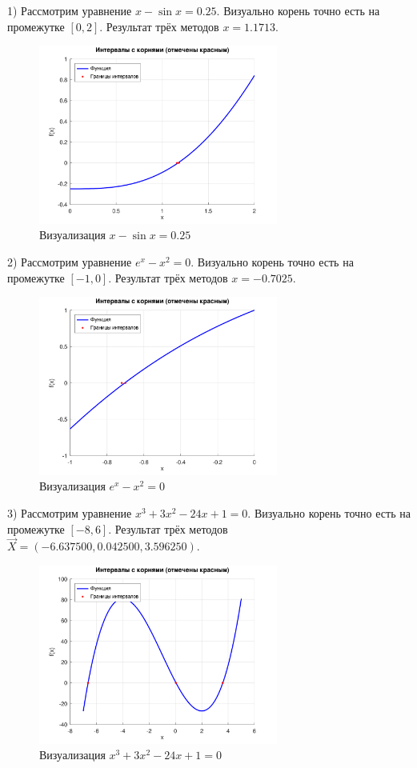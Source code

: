\documentclass[a4paper, 12pt]{article}
\begin{document}
    \newpage

    1) Рассмотрим уравнение $x - \sin{x} = 0.25$. Визуально корень точно есть на промежутке $\left[ 0, 2 \right]$. Результат трёх методов $x = 1.1713$.

    \begin{figure}[H]
        \centering
        \includegraphics[width=0.7\textwidth]{../reports/.png/xsinx.png}
        \caption{Визуализация $x - \sin{x} = 0.25$}
    \end{figure}

    2) Рассмотрим уравнение $e^x - x^2 = 0$. Визуально корень точно есть на промежутке $\left[-1, 0\right]$. Результат трёх методов $x = -0.7025$.

    \begin{figure}[H]
        \centering
        \includegraphics[width=0.7\textwidth]{../reports/.png/exx2.png}
        \caption{Визуализация $e^x - x^2 = 0$}
    \end{figure}

    3) Рассмотрим уравнение $x^3 + 3x^2 - 24x + 1 = 0$. Визуально корень точно есть на промежутке $\left[-8, 6\right]$. Результат трёх методов $\vec{X} = (-6.637500, 0.042500, 3.596250)$.

    \begin{figure}[H]
        \centering
        \includegraphics[width=0.7\textwidth]{../reports/.png/x3.png}
        \caption{Визуализация $x^3 + 3x^2 - 24x + 1 = 0$}
    \end{figure}

    
\end{document}
